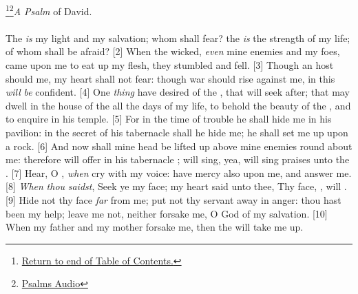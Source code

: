 \footnote{\textcolor[cmyk]{0.99998,1,0,0}{\hyperlink{TOC}{Return to end of Table of Contents.}}}\footnote{\href{https://www.audioverse.org/english/audiobibles/books/ENGKJV/O/Ps/1}{\textcolor[cmyk]{0.99998,1,0,0}{Psalms Audio}}}\textcolor[cmyk]{0.99998,1,0,0}{\emph{A Psalm} of David.} \\
\\
\textcolor[cmyk]{0.99998,1,0,0}{The  \emph{is} my light and my salvation; whom shall  fear? the  \emph{is} the strength of my life; of whom shall  be afraid?}
[2] \textcolor[cmyk]{0.99998,1,0,0}{When the wicked, \emph{even} mine enemies and my foes, came upon me to eat up my flesh, they stumbled and fell.}
[3] \textcolor[cmyk]{0.99998,1,0,0}{Though an host should  me, my heart shall not fear: though war should rise against me, in this \emph{will}  \emph{be} confident.}
[4] \textcolor[cmyk]{0.99998,1,0,0}{One \emph{thing} have  desired of the , that will  seek after; that  may dwell in the house of the  all the days of my life, to behold the beauty of the , and to enquire in his temple.}
[5] \textcolor[cmyk]{0.99998,1,0,0}{For in the time of trouble he shall hide me in his pavilion: in the secret of his tabernacle shall he hide me; he shall set me up upon a rock.}
[6] \textcolor[cmyk]{0.99998,1,0,0}{And now shall mine head be lifted up above mine enemies round about me: therefore will  offer in his tabernacle ;  will sing, yea,  will sing praises unto the .}
[7] \textcolor[cmyk]{0.99998,1,0,0}{Hear, O , \emph{when}  cry with my voice: have mercy also upon me, and answer me.}
[8] \textcolor[cmyk]{0.99998,1,0,0}{\emph{When} \emph{thou} \emph{saidst}, Seek ye my face; my heart said unto thee, Thy face, , will .}
[9] \textcolor[cmyk]{0.99998,1,0,0}{Hide not thy face \emph{far} from me; put not thy servant away in anger: thou hast been my help; leave me not, neither forsake me, O God of my salvation.}
[10] \textcolor[cmyk]{0.99998,1,0,0}{When my father and my mother forsake me, then the  will take me up.}
